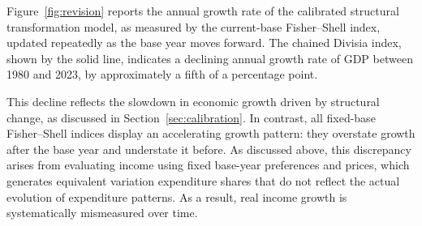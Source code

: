\documentclass[12pt,a4paper]{article}
\begin{document}
{%

Figure~\ref{fig:revision} reports the annual growth rate of the calibrated structural transformation model, as measured by the current-base Fisher--Shell index, updated repeatedly as the base year moves forward.  
The chained Divisia index, shown by the solid line, indicates a declining annual growth rate of GDP between 1980 and 2023, by approximately a fifth of a percentage point.} %
This decline reflects the slowdown in economic growth driven by structural change, as discussed in Section~\ref{sec:calibration}. %
In contrast, all fixed-base Fisher--Shell indices display an accelerating growth pattern: they overstate growth after the base year and understate it before.  
As discussed above, this discrepancy arises from evaluating income using fixed base-year preferences and prices, which generates equivalent variation expenditure shares that do not reflect the actual evolution of expenditure patterns.
As a result, real income growth is systematically mismeasured over time.

\end{document}
